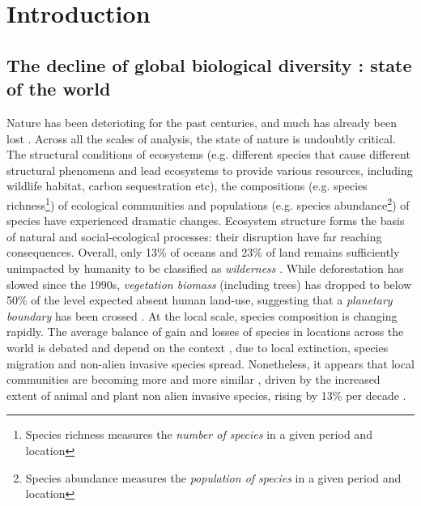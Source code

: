 \chapter*{Introduction}
\label{Introduction}

\section*{The decline of global biological diversity : state of the world}
\label{intro:facts}
Nature has been deterioting for the past centuries, and much has already been lost \citep{ipbes_2022_6417333}. Across all the scales of analysis, the state of nature is undoubtly critical. The structural conditions of ecosystems (e.g. different species that cause different structural phenomena and lead ecosystems to provide various resources, including wildlife habitat, carbon sequestration etc), the compositions (e.g. species richness\footnote{ Species richness measures the \textit{number of species} in a given period and location}) of ecological communities and populations (e.g. species abundance\footnote{ Species abundance measures the \textit{population of species} in a given period and location}) of species have experienced dramatic changes. 
Ecosystem structure forms the basis of natural and social-ecological processes: their disruption have far reaching consequences. Overall, only 13\% of oceans and 23\% of land remains sufficiently unimpacted by humanity to be classified as \textit{wilderness} \citep{jones_2018_location, watson_2016_catastrophic}. While deforestation has slowed since the 1990s, \textit{vegetation biomass} (including trees) has dropped to below 50\% of the level expected absent human land-use, suggesting that a \textit{planetary boundary} has been crossed \citep{steffen_2015_planetary}.
%
At the local scale, species composition is changing rapidly. The average balance of gain and losses of species in locations across the world is debated and depend on the context \citep{thomas_2013_local}, due to local extinction, species migration and non-alien invasive species spread. Nonetheless, it appears that local communities are becoming more and more similar \citep{mckinney_1999_biotic}, driven by the increased extent of animal and plant non alien invasive species, rising by 13\% per decade \citep{seebens_no_2017}. 
%
